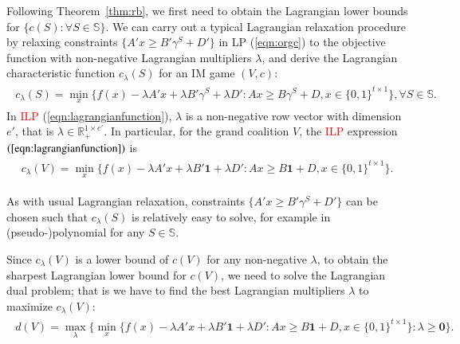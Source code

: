\documentclass[authoryear,review,12pt]{elsarticle}
\newcommand{\R}{\mathbb{R}}
\begin{document}
Following Theorem~\ref{thm:rb}, we first need to obtain the Lagrangian lower bounds for $\big\{c(S):\forall S \in \mathbb{S}\big\}$.
We can carry out a typical Lagrangian relaxation procedure by relaxing constraints $\{A'x \geq B'\gamma^S + D'\}$ in LP (\ref{eqn:orgc}) to the objective function with non-negative Lagrangian multipliers $\lambda$, and derive the Lagrangian characteristic function $c_{\lambda}(S)$ for an IM game $(V,c)$:
\begin{eqnarray}\label{eqn:lagrangianfunction}
\begin{aligned}
c_{\lambda}(S) = \min_{x} \bigg\{ f(x)-\lambda A'x + \lambda B'\gamma^S + \lambda D':Ax \geq B\gamma^S + D, x \in \{0,1\}^{t \times 1} \bigg\}, \forall S \in \mathbb{S}.
\end{aligned}
\end{eqnarray}
In \textcolor{red}{ILP} (\ref{eqn:lagrangianfunction}), $\lambda$ is a non-negative row vector with dimension $e'$, that is $\lambda \in \R_{+}^{1 \times e'}$. In particular, for the grand coalition $V$, the \textcolor{red}{ILP} expression $(\ref{eqn:lagrangianfunction})$ is
\begin{eqnarray*}\label{eqn:lagrangianfunctionN}
\begin{aligned}
c_{\lambda}(V) = \min_{x} \bigg\{ f(x)-\lambda A'x + \lambda B'\textbf{1}+ \lambda D':Ax \geq B\textbf{1} + D, x \in \{0,1\}^{t \times 1} \bigg\}.
\end{aligned}
\end{eqnarray*}

As with usual Lagrangian relaxation, constraints $\{A'x \geq B'\gamma^S + D'\}$ can be chosen such that $c_{\lambda}(S)$ is relatively easy to solve, for example in (pseudo-)polynomial for any $S \in \mathbb{S}$.

Since $c_{\lambda}(V)$ is a lower bound of $c(V)$ for any non-negative $\lambda$, to obtain the sharpest Lagrangian lower bound for $c(V)$, we need to solve the Lagrangian dual problem; that is we have to find the best Lagrangian multipliers $\lambda$ to maximize $c_{\lambda}(V)$:
\begin{eqnarray*}\label{eqn:lagrangianfunctionmax}
\begin{aligned}
d(V) = \max_{\lambda} \bigg\{ \min_{x} \big\{ f(x)-\lambda A'x + \lambda B'\textbf{1} + \lambda D':Ax \geq B\textbf{1} + D, x \in \{0,1\}^{t \times 1} \big\}:\lambda \geq \textbf{0} \bigg\}.
\end{aligned}
\end{eqnarray*}
\end{document}
